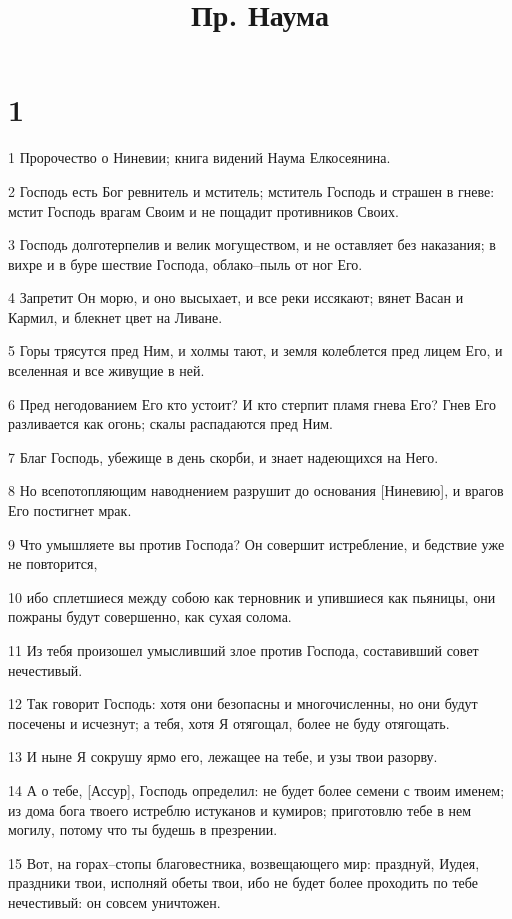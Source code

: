 

\title{Пр. Наума}


\chapter{1}

\par 1 Пророчество о Ниневии; книга видений Наума Елкосеянина.
\par 2 Господь есть Бог ревнитель и мститель; мститель Господь и страшен в гневе: мстит Господь врагам Своим и не пощадит противников Своих.
\par 3 Господь долготерпелив и велик могуществом, и не оставляет без наказания; в вихре и в буре шествие Господа, облако--пыль от ног Его.
\par 4 Запретит Он морю, и оно высыхает, и все реки иссякают; вянет Васан и Кармил, и блекнет цвет на Ливане.
\par 5 Горы трясутся пред Ним, и холмы тают, и земля колеблется пред лицем Его, и вселенная и все живущие в ней.
\par 6 Пред негодованием Его кто устоит? И кто стерпит пламя гнева Его? Гнев Его разливается как огонь; скалы распадаются пред Ним.
\par 7 Благ Господь, убежище в день скорби, и знает надеющихся на Него.
\par 8 Но всепотопляющим наводнением разрушит до основания [Ниневию], и врагов Его постигнет мрак.
\par 9 Что умышляете вы против Господа? Он совершит истребление, и бедствие уже не повторится,
\par 10 ибо сплетшиеся между собою как терновник и упившиеся как пьяницы, они пожраны будут совершенно, как сухая солома.
\par 11 Из тебя произошел умысливший злое против Господа, составивший совет нечестивый.
\par 12 Так говорит Господь: хотя они безопасны и многочисленны, но они будут посечены и исчезнут; а тебя, хотя Я отягощал, более не буду отягощать.
\par 13 И ныне Я сокрушу ярмо его, лежащее на тебе, и узы твои разорву.
\par 14 А о тебе, [Ассур], Господь определил: не будет более семени с твоим именем; из дома бога твоего истреблю истуканов и кумиров; приготовлю тебе в нем могилу, потому что ты будешь в презрении.
\par 15 Вот, на горах--стопы благовестника, возвещающего мир: празднуй, Иудея, праздники твои, исполняй обеты твои, ибо не будет более проходить по тебе нечестивый: он совсем уничтожен.

